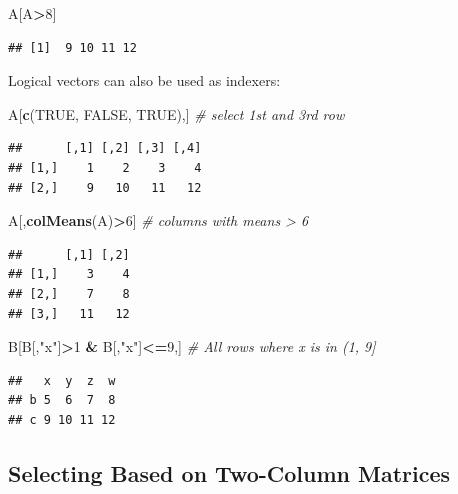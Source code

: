 \documentclass[10pt,b5paper,krantz1]{krantz}
\newenvironment{Shaded}{\begin{snugshade}}{\end{snugshade}}
\newcommand{\CommentTok}[1]{\textcolor[rgb]{0.37,0.37,0.37}{\textit{#1}}}
\newcommand{\DecValTok}[1]{\textcolor[rgb]{0.06,0.06,0.06}{#1}}
\newcommand{\KeywordTok}[1]{\textcolor[rgb]{0.27,0.27,0.27}{\textbf{#1}}}
\newcommand{\NormalTok}[1]{#1}
\newcommand{\OperatorTok}[1]{\textcolor[rgb]{0.43,0.43,0.43}{\textbf{#1}}}
\newcommand{\OtherTok}[1]{\textcolor[rgb]{0.37,0.37,0.37}{#1}}
\newcommand{\StringTok}[1]{\textcolor[rgb]{0.5,0.5,0.5}{#1}}
\begin{document}
\begin{Shaded}
\begin{Highlighting}[]
\NormalTok{A[A}\OperatorTok{>}\DecValTok{8}\NormalTok{]}
\end{Highlighting}
\end{Shaded}

\begin{verbatim}
## [1]  9 10 11 12
\end{verbatim}

Logical vectors can also be used as indexers:

\begin{Shaded}
\begin{Highlighting}[]
\NormalTok{A[}\KeywordTok{c}\NormalTok{(}\OtherTok{TRUE}\NormalTok{, }\OtherTok{FALSE}\NormalTok{, }\OtherTok{TRUE}\NormalTok{),] }\CommentTok{# select 1st and 3rd row}
\end{Highlighting}
\end{Shaded}

\begin{verbatim}
##      [,1] [,2] [,3] [,4]
## [1,]    1    2    3    4
## [2,]    9   10   11   12
\end{verbatim}

\begin{Shaded}
\begin{Highlighting}[]
\NormalTok{A[,}\KeywordTok{colMeans}\NormalTok{(A)}\OperatorTok{>}\DecValTok{6}\NormalTok{] }\CommentTok{# columns with means > 6}
\end{Highlighting}
\end{Shaded}

\begin{verbatim}
##      [,1] [,2]
## [1,]    3    4
## [2,]    7    8
## [3,]   11   12
\end{verbatim}

\begin{Shaded}
\begin{Highlighting}[]
\NormalTok{B[B[,}\StringTok{"x"}\NormalTok{]}\OperatorTok{>}\DecValTok{1} \OperatorTok{&}\StringTok{ }\NormalTok{B[,}\StringTok{"x"}\NormalTok{]}\OperatorTok{<=}\DecValTok{9}\NormalTok{,] }\CommentTok{# All rows where x is in (1, 9]}
\end{Highlighting}
\end{Shaded}

\begin{verbatim}
##   x  y  z  w
## b 5  6  7  8
## c 9 10 11 12
\end{verbatim}

\hypertarget{selecting-based-on-two-column-matrices}{%
\subsection{Selecting Based on Two-Column Matrices}\label{selecting-based-on-two-column-matrices}}
\end{document}
